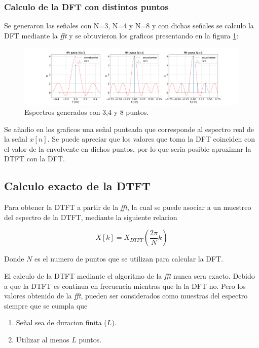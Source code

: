 \documentclass[letterpaper]{article}
\begin{document}
\subsubsection{Calculo de la DFT con distintos puntos}    
Se generaron las señales con N=3, N=4 y N=8 y con dichas señales se calculo la DFT mediante la \textit{fft} y se obtuvieron los graficos presentando en la figura \ref{fig.3b}:

\begin{figure}[htb]
\centering
\includegraphics[width=\textwidth]{Img/punto_3_b.png}
\caption{Espectros generados con 3,4 y 8 puntos.}
\label{fig.3b}
\end{figure}

Se añadio en los graficos una señal punteada que corresponde al espectro real de la señal $x[n]$.
Se puede apreciar que los valores que toma la DFT coinciden con el valor de la envolvente en dichos puntos, por lo que seria posible aproximar la DTFT con la DFT.



\subsection{Calculo exacto de la DTFT}

    Para obtener la DTFT a partir de la \textit{fft}, la cual se puede asociar a un muestreo del espectro
    de la DTFT, mediante la siguiente relacion 

    \begin{equation}
        X[k]=X_{DTFT}\left(  \frac{2 \pi}{N} k \right)
    \end{equation}

    Donde $N$ es el numero de puntos que se utilizan para calcular la DFT.

    El calculo de la DTFT mediante el algoritmo de la \textit{fft} nunca sera exacto. Debido a que la DTFT es continua en frecuencia 
    mientras que la la DFT no. Pero los valores obtenido de la \textit{fft}, pueden ser considerados como muestras del espectro siempre que se 
    cumpla que 

    \begin{enumerate}
        \item Señal sea de duracion finita ($L$).
        \item Utilizar al menos $L$ puntos.
    \end{enumerate}
    
\end{document}
